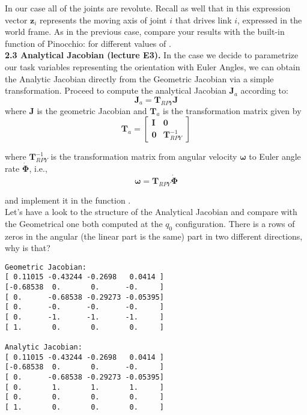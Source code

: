 \documentclass[11pt]{article}
\begin{document}
In our case all of the joints are revolute. Recall as well that in this expression vector $\mathbf{z}_i$ represents the moving axis of joint $i$ that drives link $i$, expressed in the world frame. As in the previous case, compare your results with the built-in function of Pinocchio:
 for different values of .\\

\textbf{2.3 Analytical Jacobian (lecture E3).} In the case we decide to parametrize our task variables representing the orientation with Euler Angles, we can obtain the Analytic Jacobian directly from the Geometric Jacobian via a simple transformation. Proceed to compute the analytical Jacobian $\mathbf{J}_a$ according to:
%
\begin{equation*}
	\mathbf{J}_a = \mathbf{T}_{RPY} \mathbf{J}
\end{equation*}
where $\mathbf{J}$ is the geometric Jacobian and $\mathbf{T}_a$ is the transformation matrix given by
\begin{equation*}
	\mathbf{T}_a = \begin{bmatrix}
		\mathbf{I} & \mathbf{0} \\
		\mathbf{0} & \mathbf{T}_{RPY}^{-1}
	\end{bmatrix}
\end{equation*}

where $\mathbf{T}_{RPY}^{-1}$ is the transformation matrix from angular velocity $\boldsymbol{\omega}$ to Euler angle rate $\dot{\mathbf{\Phi}}$, i.e.,
\begin{equation*}
	\boldsymbol{\omega} = \mathbf{T}_{RPY} \dot{\mathbf{\Phi}}
\end{equation*}

and implement it in the function .\\
Let's have a look to the structure of the Analytical Jacobian and compare with the Geometrical one both computed at the $q_0$ configuration. 
There is a rows of zeros in the angular (the linear part is the same) part in two different directions, why is that?

\begin{verbatim}
Geometric Jacobian:
[ 0.11015 -0.43244 -0.2698   0.0414 ]
[-0.68538  0.       0.      -0.     ]
[ 0.      -0.68538 -0.29273 -0.05395]
[ 0.      -0.      -0.      -0.     ]
[ 0.      -1.      -1.      -1.     ]
[ 1.       0.       0.       0.     ]

Analytic Jacobian:
[ 0.11015 -0.43244 -0.2698   0.0414 ]
[-0.68538  0.       0.      -0.     ]
[ 0.      -0.68538 -0.29273 -0.05395]
[ 0.       1.       1.       1.     ]
[ 0.       0.       0.       0.     ]
[ 1.       0.       0.       0.     ]
\end{verbatim}
\end{document}
